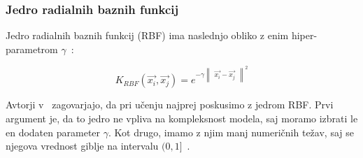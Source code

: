 \subsubsection{Jedro radialnih baznih funkcij}{
Jedro radialnih baznih funkcij (RBF) ima naslednjo obliko z enim hiper-parametrom $\gamma$~\cite{hsu2003practical}:

\begin{equation} \label{eq:rbf-kernel}
		K_{RBF}(\vec{x_i}, \vec{x_j}) = e^{
        	-\gamma 
        	\begin{Vmatrix}
        		\vec{x_i} - \vec{x_j}
        	\end{Vmatrix}^2
        }
\end{equation}

Avtorji v~\cite{hsu2003practical} zagovarjajo, da pri učenju najprej poskusimo z jedrom RBF. Prvi argument je, da to jedro ne vpliva na kompleksnost modela, saj moramo izbrati le en dodaten parameter $\gamma$. Kot drugo, imamo z njim manj numeričnih težav, saj se njegova vrednost giblje na intervalu $(0, 1]$~\cite{hsu2003practical}. 


\begin{comment}
\subsubsection{Jedro preseka generaliziranih histogramov}\label{sec:ghi}
Jedro preseka generaliziranih histogramov (GHI) je uporaben, ko imamo deskriptorje definirane kot histograme. Določen z enačbo~\eqref{eq:ghi-kernel}, kjer je hiper-parameter $\beta \geq 0$, $m$ pa je število stolpcev histogramov $\vec{x}$ in $\vec{x}'$~\cite{boughorbel2005generalized}.

\begin{equation}\label{eq:ghi-kernel}
K_{GHI}(\vec{x}, \vec{x}') = \sum_{i=1}^m min\left\{ \left| x_i \right|^\beta, \left|  x_i' \right| \right\}
\end{equation}

Po~\cite{boughorbel2005generalized} je prednost uporabe GHI jedra ta, da so meje invariantne na skaliranje prostora značilk, zato ne potrebujemo dodatne optimizacije skalirnega hiper-parametra. Optimalna vrednosti hiper-parametra je okoli $\beta=0.25$.

\end{comment}





}
